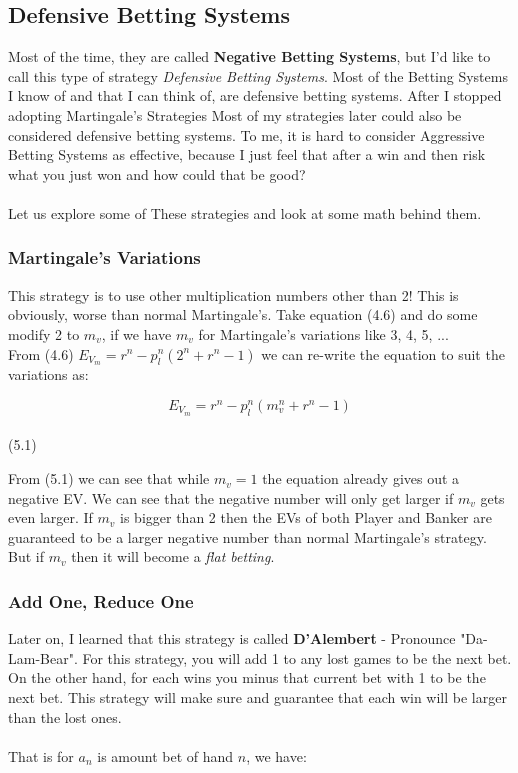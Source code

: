 \documentclass{article}
\begin{document}
\subsection{Defensive Betting Systems}

Most of the time, they are called \textbf{Negative Betting Systems}, but I'd like to call this type of strategy \emph{Defensive Betting Systems}.  Most of the Betting Systems I know of and that I can think of, are defensive betting systems.  After I stopped adopting Martingale's Strategies  Most of my strategies later could also be considered defensive betting systems.  To me, it is hard to consider Aggressive Betting Systems as effective, because I just feel that after a win and then risk what you just won and how could that be good? \\
\\
Let us explore some of These strategies and look at some math behind them. 
\subsubsection{Martingale's Variations}
This strategy is to use other multiplication numbers other than 2! This is obviously, worse than normal Martingale's.  Take equation (4.6) and do some modify 2 to $m_v$, if we have $m_v$ for Martingale's variations like 3, 4, 5, ...\\
From (4.6) $E_{V_m}=r^n-p_l^n(2^n+r^n-1)$ we can re-write the equation to suit the variations as:\par
\begin{center}
$$E_{V_m}=r^n-p_l^n(m_v^n+r^n-1)$$\\
(5.1)\\
\end{center}

From (5.1) we can see that while $m_v=1$ the equation already gives out a negative EV.  We can see that the negative number will only get larger if $m_v$ gets even larger.  If $m_v$ is bigger than 2 then the EVs of both Player and Banker are guaranteed to be a larger negative number than normal Martingale's strategy. But if $m_v$ then it will become a \emph{flat betting}.\\

\subsubsection{Add One, Reduce One}
Later on, I learned that this strategy is called \textbf{D'Alembert} - Pronounce "Da-Lam-Bear". For this strategy, you will add 1 to any lost games to be the next bet.  On the other hand, for each wins you minus that current bet with 1 to be the next bet.  This strategy will make sure and guarantee that each win will be larger than the lost ones. \\
\\
That is for $a_n$ is amount bet of hand $n$, we have:\par
\end{document}
